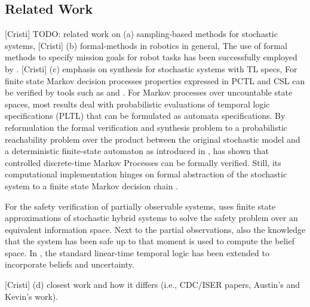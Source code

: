 \documentclass[conference]{IEEEtran}
\newcommand{\cristi}[1]{{\color{orange} [Cristi] #1}}
\begin{document}
	\subsection{Related Work}
	\cristi{TODO: related work on
	(a) sampling-based methods for stochastic systems,}
	\cristi{(b) formal-methods in robotics in general,}
	The use of formal methods to specify mission goals for robot tasks has been successfully employed by \cite{DiKlChBe-RAM-2011,KB-TAC08-LTLCon}.  %
	\cristi{(c) emphasis on synthesis for stochastic systems with TL specs,}
    For finite state Markov decision processes properties expressed in PCTL and CSL can be verified by tools such as \cite{KNP11} and  \cite{dehnert2017storm}. 
	For Markov processes over uncountable state spaces, most results deal with  probabilistic evaluations of temporal logic specifications (PLTL) that can be formulated as automata specifications. By reformulation the formal verification and synthesis problem to a probabilistic reachability problem over the product between the original stochastic model and a deterministic finite-state automaton %
	as introduced in \cite{AbateQuanti}, \cite{tmka2013} has shown that controlled discrete-time Markov Processes can be formally verified. Still, its  computational implementation  hinges on formal abstraction of the stochastic system to a finite state Markov decision chain \cite{soudjani2015faust}.  
	
	For the safety verification of partially observable systems, \cite{Lesser2015} uses finite state approximations of stochastic hybrid systems to solve the safety problem over an equivalent information space. Next to the partial observations, also the knowledge that the system has been safe up to that moment is used to compute the belief space. %
	In \cite{Cristi-CDC-2016}, the standard linear-time temporal logic has been extended to incorporate beliefs and uncertainty. 
	
	
	
	\cristi{	(d) closest work and how it differs (i.e., CDC/ISER papers, Austin's and Kevin's work).
	}

	
	
\end{document}
